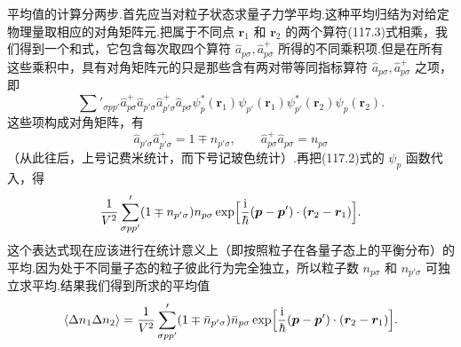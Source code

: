 平均值的计算分两步.首先应当对粒子状态求量子力学平均.这种平均归结为对给定物理量取相应的对角矩阵元.把属于不同点 $\boldsymbol{r}_{1}$ 和 $\boldsymbol{r}_{2}$ 的两个算符(117.3)式相乘，我们得到一个和式，它包含每次取四个算符
$\hat{a}_{p\sigma},\hat{a}^{+}_{p\sigma}$ 所得的不同乘积项.但是在所有这些乘积中，具有对角矩阵元的只是那些含有两对带等同指标算符 $\hat{a}_{p\sigma},\hat{a}^{+}_{p\sigma}$ 之项，即
\begin{equation*}
  \sum'_{\sigma pp'}\hat{a}^{+}_{p\sigma}\hat{a}_{p'\sigma}
  \hat{a}^{+}_{p'\sigma}\hat{a}_{p\sigma}
  \psi^{*}_{p}(\boldsymbol{r}_{1})\psi_{p'}(\boldsymbol{r}_{1})
  \psi^{*}_{p'}(\boldsymbol{r}_{2})\psi_{p}(\boldsymbol{r}_{2}).
\end{equation*}
这些项构成对角矩阵，有
\begin{equation*}
  \hat{a}_{p'\sigma}\hat{a}^{+}_{p'\sigma}=1\mp n_{p'\sigma},\qquad
  \hat{a}^{+}_{p\sigma}\hat{a}_{p\sigma}=n_{p\sigma}
\end{equation*}
（从此往后，上号记费米统计，而下号记玻色统计）.再把(117.2)式的 $\psi_{p}$ 函数代入，得
\begin{equation*}
  \frac{1}{V^{2}}\sum'_{\sigma pp'}(1\mp n_{p'\sigma})n_{p\sigma}
  \exp\Bigl[\frac{\mathrm{i}}{\hbar}
  (\boldsymbol{p}-\boldsymbol{p}')\cdot(\boldsymbol{r}_{2}-\boldsymbol{r}_{1})\Bigr].
\end{equation*}
这个表达式现在应该进行在统计意义上（即按照粒子在各量子态上的平衡分布）的平均.因为处于不同量子态的粒子彼此行为完全独立，所以粒子数 $n_{p\sigma}$ 和 $n_{p'\sigma}$ 可独立求平均.结果我们得到所求的平均值
\begin{equation}
  \left\langle\Delta n_{1}\Delta n_{2}\right\rangle
  =\frac{1}{V^{2}}\sum'_{\sigma pp'}(1\mp\bar{n}_{p'\sigma})\bar{n}_{p\sigma}
  \exp\Bigl[\frac{\mathrm{i}}{\hbar}
  (\boldsymbol{p}-\boldsymbol{p}')\cdot(\boldsymbol{r}_{2}-\boldsymbol{r}_{1})\Bigr].
\end{equation}

